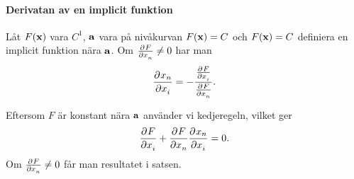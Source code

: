 \proof

\paragraph{Derivatan av en implicit funktion}
Låt $F(\vect{x})$ vara $C^1$, $\vect{a}$ vara på nivåkurvan $F(\vect{x}) = C$ och $F(\vect{x}) = C$ definiera en implicit funktion nära $\vect{a}$. Om $\pdeval{F}{x_n}{\vect{a}}\neq 0$ har man
\begin{align*}
	\pdeval{x_n}{x_i}{\vect{a}'} = -\frac{\pdeval{F}{x_i}{\vect{a}}}{\pdeval{F}{x_n}{\vect{a}}}.
\end{align*}

\proof
Eftersom $F$ är konstant nära $\vect{a}$ använder vi kedjeregeln, vilket ger
\begin{align*}
	\pdeval{F}{x_i}{\vect{a}} + \pdeval{F}{x_n}{\vect{a}}\pdeval{x_n}{x_i}{\vect{a}'} = 0.
\end{align*}
Om $\pdeval{F}{x_n}{\vect{a}}\neq 0$ får man resultatet i satsen.